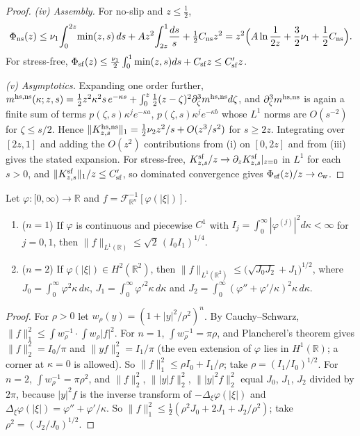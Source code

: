 \begin{proof}
\emph{(iv) Assembly.} For no-slip and $z\le\frac12$,
\[
\Phi_{\rm ns}(z)\le\nu_1\!\int_0^{2z}\!\min(z,s)\,ds+Az^2\!\int_{2z}^1\!\frac{ds}s+\tfrac12C_{\rm ns}z^2
=z^2\Big(A\ln\frac1{2z}+\frac32\nu_1+\frac12C_{\rm ns}\Big).
\]
For stress-free, $\Phi_{\rm sf}(z)\le\frac{\nu_1}2\int_0^1\min(z,s)ds+C_{\rm sf}z\le C'_{\rm sf}z$.

\emph{(v) Asymptotics.} Expanding one order further,
$m^{\rm hs,ns}(\kappa;z,s)=\tfrac12z^2\kappa^2s\,e^{-\kappa s}+\int_0^z\tfrac12(z-\zeta)^2\partial_\zeta^3m^{\rm
hs,ns}d\zeta$, and $\partial_\zeta^3m^{\rm hs,ns}$ is again a finite sum of terms $p(\zeta,s)\kappa^je^{-\kappa
a}$, $p(\zeta,s)\kappa^je^{-\kappa b}$ whose $L^1$ norms are $O(s^{-2})$ for $\zeta\le s/2$. Hence
$\|K^{\rm hs,ns}_{z,s}\|_1=\tfrac12\nu_2z^2/s+O(z^3/s^2)$ for $s\ge2z$. Integrating over $[2z,1]$ and adding the
$O(z^2)$ contributions from (i) on $[0,2z]$ and from (iii) gives the stated expansion. For stress-free,
$K^{\rm sf}_{z,s}/z\to\partial_zK^{\rm sf}_{z,s}|_{z=0}$ in $L^1$ for each $s>0$, and $\|K^{\rm sf}_{z,s}\|_1/z\le
C'_{\rm sf}$, so dominated convergence gives $\Phi_{\rm sf}(z)/z\to c_{\rm w}$.
\end{proof}

\begin{lemma}\label{lem:carlson}
Let $\varphi:[0,\infty)\to\mathbb R$ and $f=\mathcal F^{-1}_{\mathbb R^n}[\varphi(|\xi|)]$.
\begin{enumerate}
\item[(a)] ($n=1$) If $\varphi$ is continuous and piecewise $C^1$ with
$I_j=\int_0^\infty|\varphi^{(j)}|^2d\kappa<\infty$ for $j=0,1$, then $\|f\|_{L^1(\mathbb R)}\le\sqrt2\,(I_0I_1)^{1/4}$.
\item[(b)] ($n=2$) If $\varphi(|\xi|)\in H^2(\mathbb R^2)$, then $\|f\|_{L^1(\mathbb R^2)}\le\big(\sqrt{J_0J_2}+J_1\big)^{1/2}$,
where $J_0=\int_0^\infty\varphi^2\kappa\,d\kappa$, $J_1=\int_0^\infty\varphi'^2\kappa\,d\kappa$ and
$J_2=\int_0^\infty(\varphi''+\varphi'/\kappa)^2\kappa\,d\kappa$.
\end{enumerate}
\end{lemma}

\begin{proof}
For $\rho>0$ let $w_\rho(y)=(1+|y|^2/\rho^2)^n$. By Cauchy--Schwarz,
$\|f\|_1^2\le\int w_\rho^{-1}\cdot\int w_\rho|f|^2$. For $n=1$, $\int w_\rho^{-1}=\pi\rho$, and Plancherel's
theorem gives $\|f\|_2^2=I_0/\pi$ and $\|yf\|_2^2=I_1/\pi$ (the even extension of $\varphi$ lies in $H^1(\mathbb R)$;
a corner at $\kappa=0$ is allowed). So $\|f\|_1^2\le\rho I_0+I_1/\rho$; take $\rho=(I_1/I_0)^{1/2}$. For $n=2$,
$\int w_\rho^{-1}=\pi\rho^2$, and $\|f\|_2^2$, $\||y|f\|_2^2$, $\||y|^2f\|_2^2$ equal $J_0$, $J_1$, $J_2$ divided by
$2\pi$, because $|y|^2f$ is the inverse transform of $-\Delta_\xi\varphi(|\xi|)$ and
$\Delta_\xi\varphi(|\xi|)=\varphi''+\varphi'/\kappa$. So $\|f\|_1^2\le\frac12(\rho^2J_0+2J_1+J_2/\rho^2)$; take
$\rho^2=(J_2/J_0)^{1/2}$.
\end{proof}


